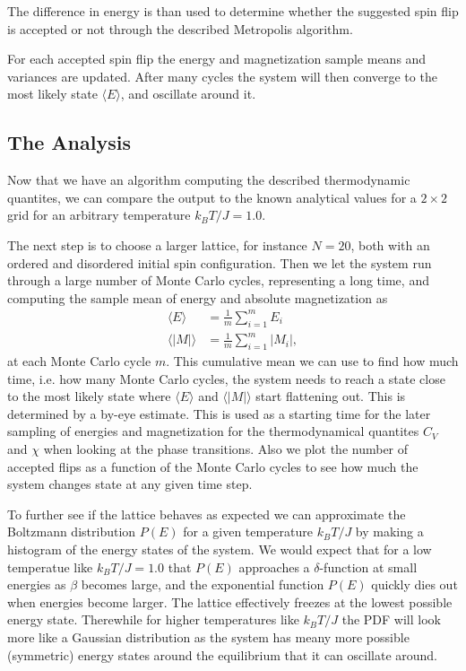 \documentclass[twocolumn]{aastex62}
\begin{document}
The difference in energy is than used to determine whether the suggested spin
flip is accepted or not through the described Metropolis algorithm.

For each accepted spin flip the energy and magnetization sample means and variances are
updated. After many cycles the system will then converge to the most likely state
$\langle E\rangle$, and oscillate around it.


\subsection{The Analysis}\label{subsec:analysis}
Now that we have an algorithm computing the described thermodynamic quantites,
we can compare the output to the known analytical values for a $2\times 2$ grid
for an arbitrary temperature $k_BT/J = 1.0$.

The next step is to choose a larger lattice, for instance $N = 20$, both
with an ordered and disordered initial spin configuration. Then we let the
system run through a large number of Monte Carlo cycles, representing a long
time, and computing the sample mean of energy and absolute magnetization as
\begin{align}
	\langle E\rangle &= \frac{1}{m}\sum_{i = 1}^m E_i\\
	\langle |M|\rangle &= \frac{1}{m}\sum_{i = 1}^m |M_i|,
\end{align}
at each Monte Carlo cycle $m$. This cumulative mean we can use to find how much
time, i.e. how many Monte Carlo cycles, the system needs to reach a state close
to the most likely state where $\langle E \rangle$ and $\langle |M|\rangle$
start flattening out. This is determined by a by-eye estimate. This is used as a
starting time for the later sampling of energies and magnetization for
the thermodynamical quantites $C_V$ and $\chi$ when looking at the phase
transitions.
Also we plot the number of accepted flips as a function of the Monte Carlo
cycles to see how much the system changes state at any given time step.

To further see if the lattice behaves as expected we can approximate the
Boltzmann distribution $P(E)$ for a given temperature $k_BT/J$ by making a
histogram of the energy states of the system. We would expect that for a low
temperatue like $k_BT / J = 1.0$ that $P(E)$ approaches a $\delta$-function at
small energies as
$\beta$ becomes large, and the exponential function $P(E)$ quickly dies out when
energies become larger. The lattice effectively freezes at the lowest possible
energy state. Therewhile for higher temperatures like $k_BT/J$ the PDF
will look more like a Gaussian distribution as the system has meany more
possible (symmetric) energy states around the equilibrium that it can oscillate
around.
\end{document}

